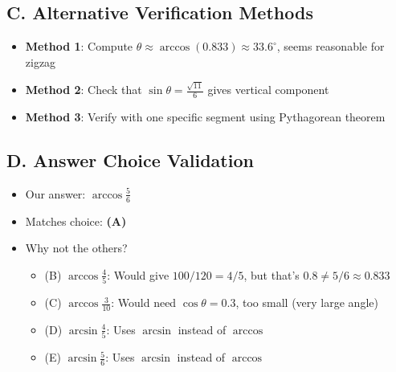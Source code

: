 \documentclass[11pt]{article}
\begin{document}
\begin{verificationbox}
\subsection*{C. Alternative Verification Methods}
\begin{itemize}[leftmargin=*]
    \item \textbf{Method 1}: Compute $\theta \approx \arccos(0.833) \approx 33.6^\circ$, seems reasonable for zigzag
    \item \textbf{Method 2}: Check that $\sin\theta = \frac{\sqrt{11}}{6}$ gives vertical component
    \item \textbf{Method 3}: Verify with one specific segment using Pythagorean theorem
\end{itemize}

\subsection*{D. Answer Choice Validation}
\begin{itemize}[leftmargin=*]
    \item Our answer: $\arccos\frac{5}{6}$
    \item Matches choice: \textbf{(A)}
    \item Why not the others?
    \begin{itemize}
        \item (B) $\arccos\frac{4}{5}$: Would give $100/120 = 4/5$, but that's $0.8 \neq 5/6 \approx 0.833$
        \item (C) $\arccos\frac{3}{10}$: Would need $\cos\theta = 0.3$, too small (very large angle)
        \item (D) $\arcsin\frac{4}{5}$: Uses $\arcsin$ instead of $\arccos$
        \item (E) $\arcsin\frac{5}{6}$: Uses $\arcsin$ instead of $\arccos$
    \end{itemize}
\end{itemize}
\end{verificationbox}
\end{document}
